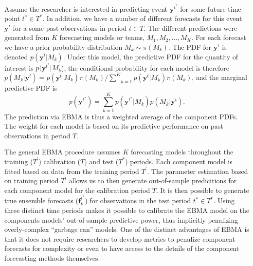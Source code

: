 \documentclass[12pt,fullpage,endnotes]{article}
\begin{document}
Assume the researcher is interested in predicting event
$\mathbf{y}^{t^*}$ for some future time point $t^\ast \in T^\ast$. In
addition, we have a number of different forecasts for this event
$\mathbf{y}^t$ for a some past observations in period $t \in T$. The
different predictions were generated from $K$ forecasting models or
teams, $M_1, M_2, \ldots, M_K$. For each forecast we have a prior
probability distribution $M_k\sim \pi(M_k)$. The PDF for
$\mathbf{y}^t$ is denoted $p(\mathbf{y}^t|M_k)$. Under this model, the
predictive PDF for the quantity of interest is
$p(\mathbf{y}^{t^*}|M_k$), the conditional probability for each model
is therefore $p(M_k|\mathbf{y}^t) =
p(\mathbf{y}^t|M_k)\pi(M_k)/\underset{k=1}{\overset{K}{\sum}}p(\mathbf{y}^t|M_k)\pi(M_k)$,
and the marginal predictive PDF is $$p(\mathbf{y}^{t^*}) =
\underset{k=1}{\overset{K}{\sum}}
p(\mathbf{y}^{t^*}|M_k)p(M_k|\mathbf{y}^{t}).$$
\noindent The prediction via EBMA is thus a weighted average of the component
PDFs. The weight for each model is based on its predictive performance
on past observations in period $T$.

The general EBMA procedure assumes $K$ forecasting models throughout
the training ($T^{\prime}$) calibration ($T$) and test ($T^\ast$)
periods. Each component model is fitted based on data from the
training period $T^\prime$. The parameter estimation based on training
period $T^{\prime}$ allows us to then generate out-of-sample
predicitions for each component model for the calibration period
$T$. It is then possible to generate true ensemble forecasts
($\mathbf{f}_k^{t^\ast}$) for observations in the test period $t^\ast
\in T^*$. Using three distinct time periods makes it possible to
calibrate the EBMA model on the components models' out-of-sample
predictive power, thus implicitly penalizing overly-complex ``garbage
can'' models. One of the distinct advantages of EBMA is that it does
not require researchers to develop metrics to penalize component
forecasts for complexity or even to have access to the details of the
component forecasting methods themselves.
\end{document}
